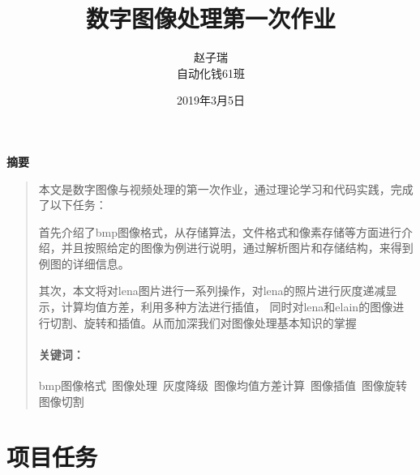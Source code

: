 \documentclass[UTF8]{ctexart}
\title{数字图像处理第一次作业}
\author{赵子瑞 \\ 自动化钱61班}
\date{2019年3月5日}
\newcommand{\xiaosi}{\fontsize{11.6pt}{\baselineskip}\selectfont}
\newcommand{\sihao}{\fontsize{12.1pt}{\baselineskip}\selectfont}
\begin{document}
\maketitle

\newenvironment{cnabandkey}[2][\sihao 摘要] %
{\newcommand{\ckeywords}{#2} %
	\begin{center} \bfseries #1 \end{center} %
	\begin{quotation}
	}{\paragraph{\sihao 关键词：} \textrm{\ckeywords} %
	\end{quotation}
}

\newenvironment{enabandkey}[2][\sihao Abstract] %
{\newcommand{\ekeywords}{#2} %
	\begin{center} \bfseries #1 \end{center} %
	\begin{quotation}
	}{\paragraph{\sihao Keywords：} \textrm{\ekeywords} %
	\end{quotation}
}

	\begin{cnabandkey}{bmp图像格式\, 图像处理\, 灰度降级\, 图像均值方差计算\, 图像插值\, 图像旋转\, 图像切割}
        \xiaosi
        \hspace{0.25em}本文是数字图像与视频处理的第一次作业，通过理论学习和代码实践，完成了以下任务：
        
        首先介绍了bmp图像格式，从存储算法，文件格式和像素存储等方面进行介绍，并且按照给定的图像为例进行说明，通过解析图片和存储结构，来得到例图的详细信息。
        
        其次，本文将对lena图片进行一系列操作，对lena的照片进行灰度递减显示，计算均值方差，利用多种方法进行插值，
        同时对lena和elain的图像进行切割、旋转和插值。从而加深我们对图像处理基本知识的掌握
		
	\end{cnabandkey}
	
	\clearpage
	
\begin{spacing}{1.2} %
\xiaosi\tableofcontents\newpage
\end{spacing}


\xiaosi
\section{项目任务}
\end{document}
